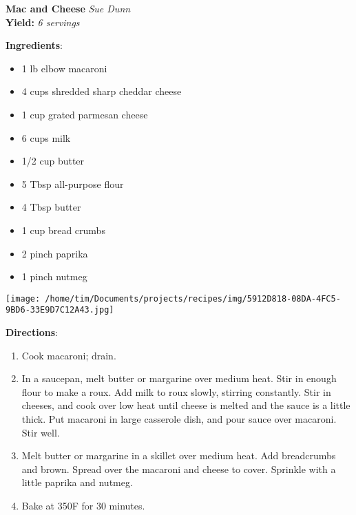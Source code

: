 \documentclass[11pt, twoside, openany]{book}
\begin{document}
\noindent\begin{minipage}[t]{\linewidth}%
{\Large\textbf{Mac and Cheese}} \label{mac-and-cheese}\hfill\textit{Sue Dunn}\\
\textbf{Yield:} \textit{6 servings}\\
\noindent\begin{minipage}[t]{0.78\linewidth}%
\textbf{Ingredients}:\vspace{-3mm}
\begin{multicols}{2}
\begin{itemize}\setlength\itemsep{-1mm}
\item 1 lb elbow macaroni
\item 4 cups shredded sharp cheddar cheese
\item 1 cup grated parmesan cheese
\item 6 cups milk
\item 1/2 cup butter
\item 5 Tbsp all-purpose flour
\item 4 Tbsp butter
\item 1 cup bread crumbs
\item 2 pinch paprika
\item 1 pinch nutmeg
\end{itemize}
\end{multicols}
\end{minipage}
\noindent\begin{minipage}[t]{0.18\linewidth}
\centering \strut\vspace*{-\baselineskip}\newline
\texttt{[image: /home/tim/Documents/projects/recipes/img/5912D818-08DA-4FC5-9BD6-33E9D7C12A43.jpg]}\\
\end{minipage}\vspace{3mm}
\textbf{Directions}:
\vspace{-3mm}\begin{enumerate}\setlength\itemsep{-1mm}
\item Cook macaroni; drain.
\item In a saucepan, melt butter or margarine over medium heat. Stir in enough flour to make a roux. Add milk to roux slowly, stirring constantly. Stir in cheeses, and cook over low heat until cheese is melted and the sauce is a little thick. Put macaroni in large casserole dish, and pour sauce over macaroni. Stir well.
\item Melt butter or margarine in a skillet over medium heat. Add breadcrumbs and brown. Spread over the macaroni and cheese to cover. Sprinkle with a little paprika and nutmeg.
\item Bake at 350F for 30 minutes.
\end{enumerate}
\end{minipage}\vspace{8mm}
\end{document}
